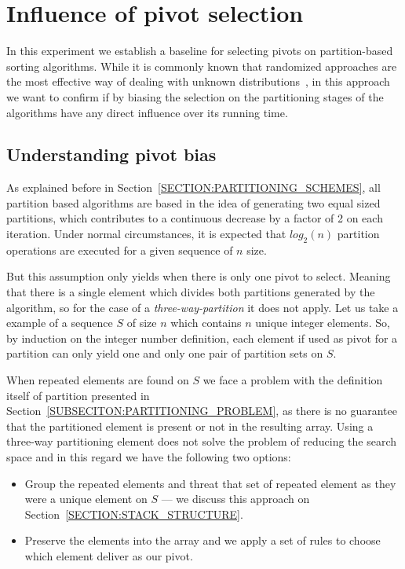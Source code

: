 \section{Influence of pivot selection}

In this experiment we establish a baseline for selecting pivots on partition-based sorting algorithms. While it is commonly known that randomized approaches are the most effective way of dealing with unknown distributions~\cite{estivil92}, in this approach we want to confirm if by biasing the selection on the partitioning stages of the algorithms have any direct influence over its running time.

\subsection{Understanding pivot bias}

As explained before in Section~\ref{SECTION:PARTITIONING_SCHEMES}, all partition based algorithms are based in the idea of generating two equal sized partitions, which contributes to a continuous decrease by a factor of 2 on each iteration. Under normal circumstances, it is expected that $log_2(n)$ partition operations are executed for a given sequence of $n$ size.

But this assumption only yields when there is only one pivot to select. Meaning that there is a single element which divides both partitions generated by the algorithm, so for the case of a \emph{three-way-partition} it does not apply. Let us take a example of a sequence $S$ of size $n$ which contains $n$ unique integer elements. So, by induction on the integer number definition, each element if used as pivot for a partition can only yield one and only one pair of partition sets on $S$.

When repeated elements are found on $S$ we face a problem with the definition itself of partition presented in Section~\ref{SUBSECITON:PARTITIONING_PROBLEM}, as there is no guarantee that the partitioned element is present or not in the resulting array. Using a three-way partitioning element does not solve the problem of reducing the search space and in this regard we have the following two options:

\begin{itemize}
    \item Group the repeated elements and threat that set of repeated element as they were a unique element on $S$ --- we discuss this approach on Section~\ref{SECTION:STACK_STRUCTURE}.
    \item Preserve the elements into the array and we apply a set of rules to choose which element deliver as our pivot.
\end{itemize}

